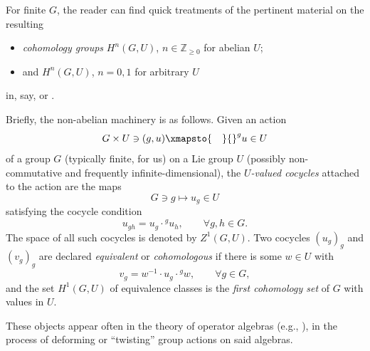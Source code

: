 \documentclass[10pt,a4paper]{amsart}
\numberwithin{equation}{section}
\newcommand\bZ{{\mathbb Z}}
\begin{document}
For finite $G$, the reader can find quick treatments of the pertinent material on the resulting
\begin{itemize}\itemsep=0pt
\item {\it cohomology groups} $H^n(G,U)$, $n\in \bZ_{\ge 0}$ for abelian $U$;
\item and $H^n(G,U)$, $n=0,1$ for arbitrary $U$
\end{itemize}
in, say, \cite[Chapter VII and its Appendix]{ser-lf} or \cite[Sections~I.2 and I.5]{ser-gal}.

Briefly, the non-abelian machinery is as follows. Given an action
\begin{equation}\label{eq:gactu}
 G\times U\ni (g,u)\xmapsto{\quad} {}^gu\in U
\end{equation}
of a group $G$ (typically finite, for us) on a Lie group $U$ (possibly non-commutative and frequently infinite-dimensional), the {\it $U$-valued cocycles} attached to the action are the maps
\begin{equation}\label{eq:gtoug}
 G\ni g\mapsto u_g\in U
\end{equation}
satisfying the cocycle condition
\begin{equation}\label{eq:cocyccond}
 u_{gh} = u_g\cdot {}^g u_h,\qquad \forall g,h\in G.
\end{equation}
The space of all such cocycles is denoted by $Z^1(G,U)$. Two cocycles $(u_g)_g$ and $(v_g)_g$ are declared {\it equivalent} or {\it cohomologous} if there is some $w\in U$ with
\begin{equation*}
 v_g = w^{-1}\cdot u_g\cdot {}^g w,\qquad \forall g\in G,
\end{equation*}
and the set $H^1(G,U)$ of equivalence classes is the {\it first cohomology set} of $G$ with values in $U$.

These objects appear often in the theory of operator algebras (e.g., \cite[Definition X.1.4]{tak2}), in the process of deforming or ``twisting'' group actions on said algebras.
\end{document}

